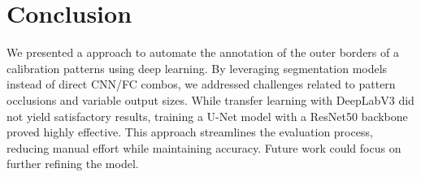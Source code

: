 \section{Conclusion}

We presented a approach to automate the annotation of the outer borders of a calibration patterns using deep learning. By leveraging
segmentation models instead of direct CNN/FC combos, we addressed challenges related to pattern occlusions and variable output sizes.
While transfer learning with DeepLabV3 did not yield satisfactory results, training a U-Net model with a ResNet50 backbone proved
highly effective. This approach streamlines the evaluation process, reducing manual effort while maintaining accuracy. Future work
could focus on further refining the model.
